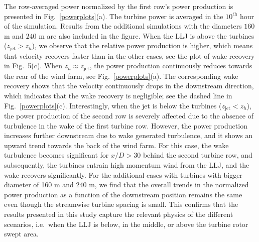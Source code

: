 \documentclass[%
 aip,
 amsmath,amssymb,
reprint,
twocolumn,%
author-numerical,%
]{revtex4-1}
\begin{document}
{The row-averaged power normalized by the first row's power production is presented in Fig.\ \ref{powerplots}(a). The turbine power is averaged in the $10^\text{th}$ hour of the simulation. {\color{black} Results from the additional simulations with the diameters $160$ m and $240$ m are also included in the figure.}
{\color{black} When the LLJ is above the turbines ($z_\text{jet} > z_h$)}, we observe that the relative power production is higher, which means that velocity recovers faster than in the other cases, see the plot of wake recovery in Fig.\ 5(c). When $z_h \approx z_\text{jet}$, the power production continuously reduces towards the rear of the wind farm, see Fig.\ \ref{powerplots}(a). The corresponding wake recovery shows that the velocity continuously drops in the downstream direction, which indicates that the wake recovery is negligible; see the dashed line in Fig.\ \ref{powerplots}(c). Interestingly, when the jet is below the turbines ($z_\text{jet} < z_h$), the power production of the second row is severely affected due to the {\color{black} absence of turbulence in the wake of the first turbine row. However, the power production increases further downstream due to wake generated turbulence, and it shows an upward trend towards the back of the wind farm.} For this case, {\color{black}the wake turbulence becomes significant for $x/D > 30$ behind the second turbine row,} and subsequently, the turbines entrain high momentum wind from the LLJ, and the wake recovers significantly. {\color{black} For the additional cases with turbines with bigger diameter of 160 m and 240 m, we find that the overall trends in the normalized power production as a function of the downstream position remains the same even though the streamwise turbine spacing is small. This confirms that the results presented in this study capture the relevant physics of the different scenarios, i.e.\ when the  LLJ is below, in the middle, or above the turbine rotor swept area.}\\
}
\end{document}
